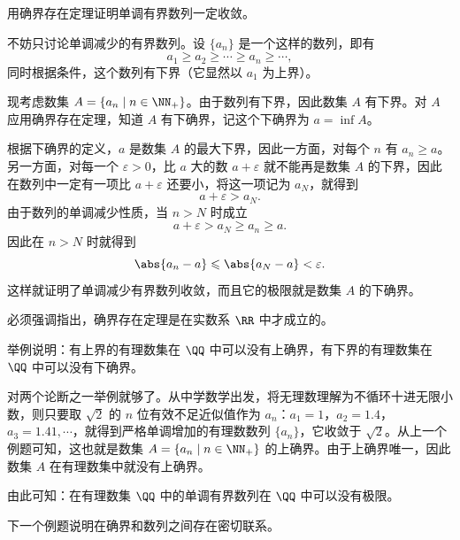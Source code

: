 \begin{xexample}[3.1.1]
用确界存在定理证明单调有界数列一定收敛。
\end{xexample}
\begin{xproof}
不妨只讨论单调减少的有界数列。设 $\{a_n\}$ 是一个这样的数列，即有
\[
  a_1\geqslant a_2\geqslant\cdots\geqslant a_n\geqslant\cdots,
\]
同时根据条件，这个数列有下界（它显然以 $a_1$ 为上界）。

现考虑数集 $A=\{a_n\mid n\in\NN_+\}$。由于数列有下界，因此数集 $A$ 有下界。对 $A$ 应用确界存在定理，知道 $A$ 有下确界，记这个下确界为 $a=\inf A$。

根据下确界的定义，$a$ 是数集 $A$ 的最大下界，因此一方面，对每个 $n$ 有 $a_n\geqslant a$。另一方面，对每一个 $\varepsilon>0$，比 $a$ 大的数 $a+\varepsilon$ 就不能再是数集 $A$ 的下界，因此在数列中一定有一项比 $a+\varepsilon$ 还要小，将这一项记为 $a_N$，就得到
\[
  a+\varepsilon>a_N.
\]
由于数列的单调减少性质，当 $n>N$ 时成立
\[
  a+\varepsilon>a_N\geqslant a_n\geqslant a.
\]
因此在 $n>N$ 时就得到
\[
  \abs{a_n-a}\leqslant\abs{a_N-a}<\varepsilon.
\]
这样就证明了单调减少有界数列收敛，而且它的极限就是数集 $A$ 的下确界。
\end{xproof}

必须强调指出，确界存在定理是在实数系 $\RR$ 中才成立的。

\begin{xexample}[3.1.2]
举例说明：有上界的有理数集在 $\QQ$ 中可以没有上确界，有下界的有理数集在 $\QQ$ 中可以没有下确界。
\end{xexample}
\begin{xsolution}
对两个论断之一举例就够了。从中学数学出发，将无理数理解为不循环十进无限小数，则只要取 $\sqrt2$ 的 $n$ 位有效不足近似值作为 $a_n$：$a_1=1$，$a_2=1.4$，$a_3=1.41,\cdots$，就得到严格单调增加的有理数数列 $\{a_n\}$，它收敛于 $\sqrt2$。从上一个例题可知，这也就是数集 $A=\{a_n\mid n\in\NN_+\}$ 的上确界。由于上确界唯一，因此数集 $A$ 在有理数集中就没有上确界。
\end{xsolution}

\begin{xremark}
由此可知：在有理数集 $\QQ$ 中的单调有界数列在 $\QQ$ 中可以没有极限。
\end{xremark}

下一个例题说明在确界和数列之间存在密切联系。

